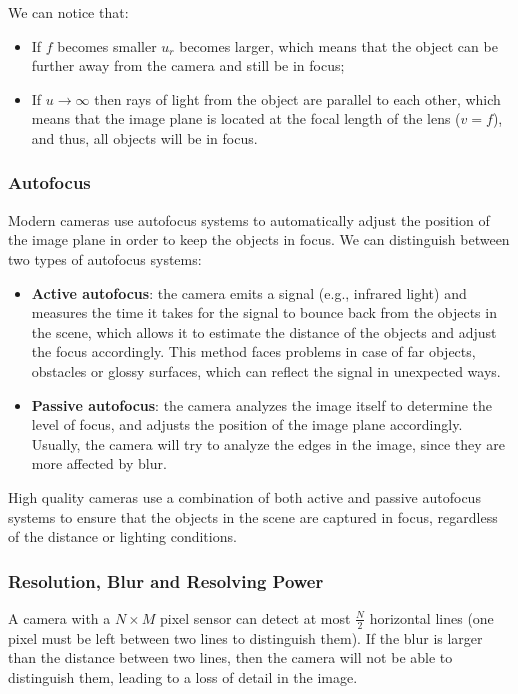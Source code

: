 We can notice that:
\begin{itemize}
    \item If $f$ becomes smaller $u_r$ becomes larger, which means that the object can be further away from the camera and still be in focus;
    \item If $u \rightarrow \infty$ then rays of light from the object are parallel to each other, which means that the image plane is located 
    at the focal length of the lens ($v = f$), and thus, all objects will be in focus.
\end{itemize}

\subsubsection{Autofocus}
Modern cameras use autofocus systems to automatically adjust the position of the image plane in order to keep the objects in focus.
We can distinguish between two types of autofocus systems:
\begin{itemize}
    \item \textbf{Active autofocus}: the camera emits a signal (e.g., infrared light) and measures the time it takes for the signal to bounce back from
    the objects in the scene, which allows it to estimate the distance of the objects and adjust the focus accordingly. This method faces problems
    in case of far objects, obstacles or glossy surfaces, which can reflect the signal in unexpected ways.
    \item \textbf{Passive autofocus}: the camera analyzes the image itself to determine the level of focus, and adjusts the position of the image plane accordingly.
    Usually, the camera will try to analyze the edges in the image, since they are more affected by blur.
\end{itemize}
High quality cameras use a combination of both active and passive autofocus systems to ensure that the objects in the scene are captured in focus, 
regardless of the distance or lighting conditions.

\subsubsection{Resolution, Blur and Resolving Power}
A camera with a $N \times M$ pixel sensor can detect at most $\frac{N}{2}$ horizontal lines (one pixel must be left between two lines to distinguish them).
If the blur is larger than the distance between two lines, then the camera will not be able to distinguish them, leading to a loss of detail in the image.


